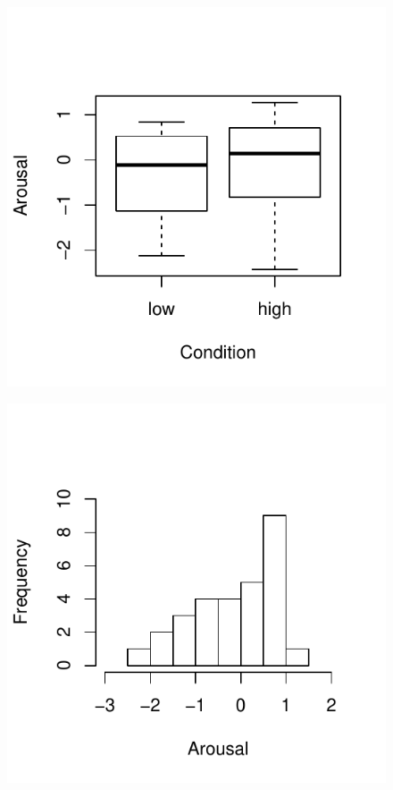 \begin{figure}
  \centering
  \includegraphics{images/arousalFactorPreBoxPlot-1}
        \label{fig:arousalFactorPreBoxPlot}
    \end{figure}

\begin{figure}
  \centering
      \includegraphics{images/histArousalFactorPreHigh-1}
        \label{fig:histArousalFactorPreHigh}
    \end{figure}

